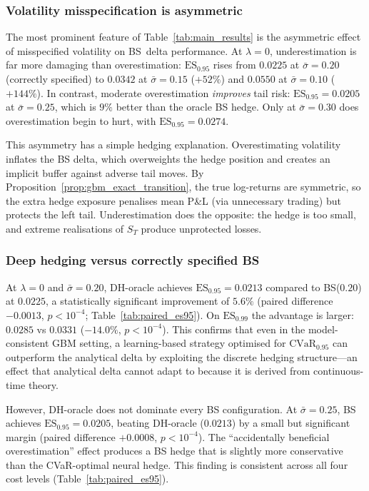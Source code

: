 \documentclass[12pt,a4paper]{article}
\theoremstyle{definition}
\theoremstyle{plain}
\theoremstyle{remark}
\theoremstyle{plain}
\begin{document}
 
\subsubsection*{Volatility misspecification is asymmetric}
 
The most prominent feature of Table~\ref{tab:main_results} is the
asymmetric effect of misspecified volatility on BS~delta performance.
At $\lambda = 0$, underestimation is far more damaging than overestimation:
$\mathrm{ES}_{0.95}$ rises from $0.0225$ at $\bar\sigma = 0.20$
(correctly specified) to $0.0342$ at $\bar\sigma = 0.15$
($+52\%$) and $0.0550$ at $\bar\sigma = 0.10$ ($+144\%$).
In contrast, moderate overestimation \emph{improves} tail risk:
$\mathrm{ES}_{0.95} = 0.0205$ at $\bar\sigma = 0.25$,
which is $9\%$ better than the oracle BS hedge.
Only at $\bar\sigma = 0.30$ does overestimation begin to hurt,
with $\mathrm{ES}_{0.95} = 0.0274$.
 
This asymmetry has a simple hedging explanation.
Overestimating volatility inflates the BS delta, which overweights
the hedge position and creates an implicit buffer against adverse
tail moves.
By Proposition~\ref{prop:gbm_exact_transition}, the true log-returns
are symmetric, so the extra hedge exposure penalises mean P\&L
(via unnecessary trading) but protects the left tail.
Underestimation does the opposite: the hedge is too small, and
extreme realisations of $S_T$ produce unprotected losses.
 
\subsubsection*{Deep hedging versus correctly specified BS}
 
At $\lambda = 0$ and $\bar\sigma = 0.20$, DH-oracle achieves
$\mathrm{ES}_{0.95} = 0.0213$ compared to BS($0.20$) at $0.0225$,
a statistically significant improvement of $5.6\%$
(paired difference $-0.0013$, $p < 10^{-4}$;
Table~\ref{tab:paired_es95}).
On $\mathrm{ES}_{0.99}$ the advantage is larger:
$0.0285$ vs $0.0331$ ($-14.0\%$, $p < 10^{-4}$).
This confirms that even in the model-consistent GBM setting,
a learning-based strategy optimised for $\mathrm{CVaR}_{0.95}$
can outperform the analytical delta by exploiting the discrete
hedging structure---an effect that analytical delta
cannot adapt to because it is derived from continuous-time theory.
 
However, DH-oracle does not dominate every BS configuration.
At $\bar\sigma = 0.25$, BS achieves $\mathrm{ES}_{0.95} = 0.0205$,
beating DH-oracle ($0.0213$) by a small but significant margin
(paired difference $+0.0008$, $p < 10^{-4}$).
The ``accidentally beneficial overestimation'' effect produces
a BS hedge that is slightly more conservative than the
CVaR-optimal neural hedge.
This finding is consistent across all four cost levels
(Table~\ref{tab:paired_es95}).
 
\end{document}
